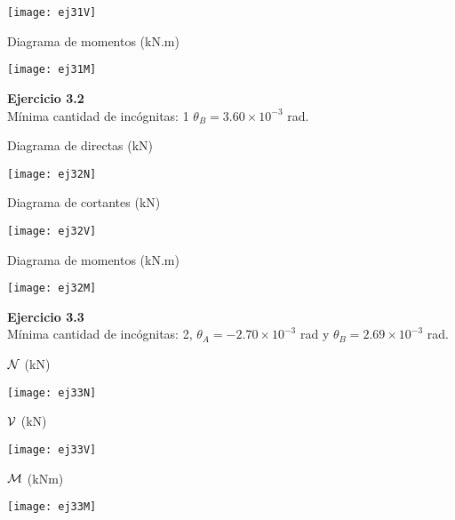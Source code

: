 	\begin{center}
	\texttt{[image: ej31V]}
\end{center}

Diagrama de momentos (kN.m)

	\begin{center}
	\texttt{[image: ej31M]}
\end{center}



\textbf{Ejercicio 3.2}\\

Mínima cantidad de incógnitas: 1 $\theta_B = 3.60 \times 10^{-3}$ rad.

Diagrama de directas (kN)

	\begin{center}
	\texttt{[image: ej32N]}
\end{center}

Diagrama de cortantes (kN)

	\begin{center}
	\texttt{[image: ej32V]}
\end{center}

Diagrama de momentos (kN.m)

	\begin{center}
	\texttt{[image: ej32M]}
\end{center}


\textbf{Ejercicio 3.3}\\

Mínima cantidad de incógnitas: 2, $\theta_A = -2.70 \times 10^{-3}$ rad y $\theta_B = 2.69 \times 10^{-3}$ rad.

${\mathcal N}$ (kN)

	\begin{center}
	\texttt{[image: ej33N]}
\end{center}

${\mathcal V}$ (kN)

	\begin{center}
	\texttt{[image: ej33V]}
\end{center}

${\mathcal M}$ (kNm)

	\begin{center}
	\texttt{[image: ej33M]}
\end{center}



